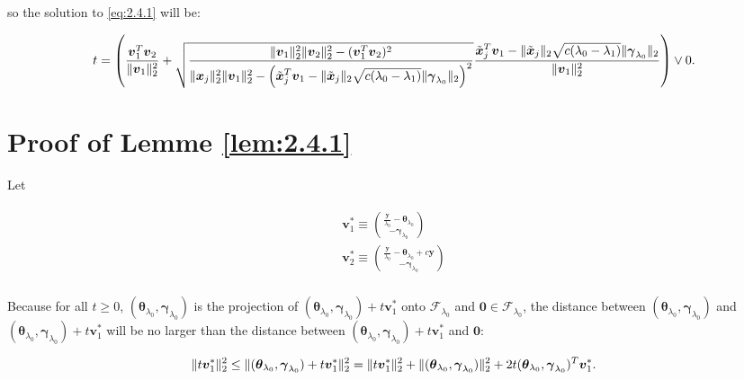 so the solution to \eqref{eq:2.4.1} will be:

\begin{equation}
    t=\left(\frac{\boldsymbol v_1^T\boldsymbol v_2}{\lVert\boldsymbol v_1\rVert_2^2}+\sqrt{\frac{\lVert\boldsymbol v_1\rVert_2^2\lVert\boldsymbol v_2\rVert_2^2-(\boldsymbol v_1^T\boldsymbol v_2)^2}{\lVert\boldsymbol x_j\rVert_2^2\lVert\boldsymbol v_1\rVert_2^2-\left(\tilde{\boldsymbol x}_j^T\boldsymbol v_1-\lVert\tilde{\boldsymbol x}_j\rVert_2\sqrt{c(\lambda_0-\lambda_1)}\lVert\boldsymbol\gamma_{\lambda_0}\rVert_2\right)^2}}\frac{\tilde{\boldsymbol x}_j^T\boldsymbol v_1-\lVert\tilde{\boldsymbol x}_j\rVert_2\sqrt{c(\lambda_0-\lambda_1)}\lVert\boldsymbol\gamma_{\lambda_0}\rVert_2}{\lVert\boldsymbol v_1\rVert_2^2}\right)\vee 0.
\end{equation}

\section{Proof of Lemme \ref{lem:2.4.1}}

Let

\begin{gather}
    \begin{aligned}
        \boldsymbol v_1^*\equiv\binom{\frac{\boldsymbol y}{\lambda_0}-\boldsymbol\theta_{\lambda_0}}{-\boldsymbol\gamma_{\lambda_0}}\\
        \boldsymbol v_2^*\equiv\binom{\frac{\boldsymbol y}{\lambda_0}-\boldsymbol\theta_{\lambda_0}+c\boldsymbol y}{-\boldsymbol\gamma_{\lambda_0}}\\
    \end{aligned}
\end{gather}

Because for all $t\geq 0$, $(\boldsymbol\theta_{\lambda_0},\boldsymbol\gamma_{\lambda_0})$ is the projection of $(\boldsymbol\theta_{\lambda_0},\boldsymbol\gamma_{\lambda_0})+t\boldsymbol v_1^*$ onto $\mathcal{F}_{\lambda_0}$ and $\boldsymbol 0\in \mathcal{F}_{\lambda_0}$, the distance between $(\boldsymbol\theta_{\lambda_0},\boldsymbol\gamma_{\lambda_0})$ and $(\boldsymbol\theta_{\lambda_0},\boldsymbol\gamma_{\lambda_0})+t\boldsymbol v_1^*$ will be no larger than the distance between $(\boldsymbol\theta_{\lambda_0},\boldsymbol\gamma_{\lambda_0})+t\boldsymbol v_1^*$ and $\boldsymbol 0$:

\begin{gather}
    \begin{aligned}
        \lVert t\boldsymbol v_1^*\rVert_2^2\leq \lVert(\boldsymbol\theta_{\lambda_0},\boldsymbol\gamma_{\lambda_0})+t\boldsymbol v_1^*\rVert_2^2=\lVert t\boldsymbol v_1^*\rVert_2^2+\lVert(\boldsymbol\theta_{\lambda_0},\boldsymbol\gamma_{\lambda_0})\rVert_2^2+2t(\boldsymbol\theta_{\lambda_0},\boldsymbol\gamma_{\lambda_0})^T\boldsymbol v_1^*.
    \end{aligned}
\end{gather}

